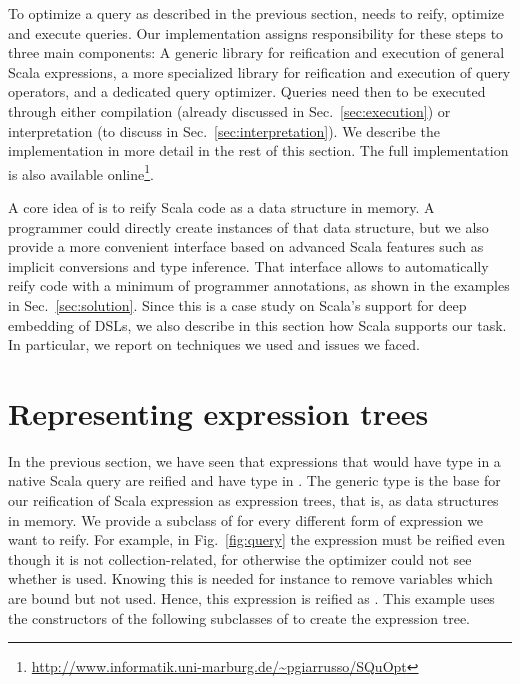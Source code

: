 To optimize a query as described in the previous section, {\LoS} needs to reify, optimize and execute queries. 
Our implementation assigns responsibility for these steps to three main components: A generic library for reification and execution of general Scala expressions, a more specialized library for reification and execution of query operators, and a dedicated query optimizer.
Queries need then to be executed through either compilation (already discussed in
Sec.~\ref{sec:execution}) or interpretation (to discuss in Sec.~\ref{sec:interpretation}).
We describe the implementation in more detail in the rest of this section. The full implementation is also available online\footnote{\url{http://www.informatik.uni-marburg.de/~pgiarrusso/SQuOpt}}.

A core idea of {\LoS} is to reify Scala code as a data structure in memory. A programmer could directly create instances of that data structure, but we also provide a more convenient interface based on advanced Scala features such as implicit conversions and type inference. That interface allows to automatically reify code with a minimum of programmer annotations, as shown in the examples in Sec.~\ref{sec:solution}. Since this is a case study on Scala's support for deep embedding of DSLs, we also describe in this section how Scala supports our task. In particular, we report on techniques we used and issues we faced.

\section{Representing expression trees}
\label{subsec:repexptrees}
In the previous section, we have seen that expressions that would have type  in a native Scala query are reified and have type  in \LoS. The generic type  is the base for our reification of Scala expression as expression trees, that is, as data structures in memory. We provide a subclass of  for every different form of expression we want to reify. For example, in Fig.~\ref{fig:query} the expression  must be reified even though it is not collection-related, for otherwise the optimizer could not see whether  is used. Knowing this is needed for instance to remove variables which are bound but not used. Hence, this expression is reified as . This example uses the constructors of the following subclasses of  to create the expression tree.

